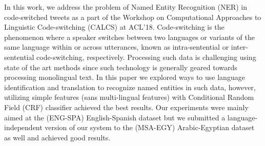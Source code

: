 In this work, we address the problem of Named Entity Recognition (NER) in code-switched tweets as a part of the Workshop on Computational Approaches to Linguistic Code-switching (CALCS) at ACL'18. Code-switching is the phenomenon where a speaker switches between two languages or variants of the same language within or across utterances, known as intra-sentential or inter-sentential code-switching, respectively. Processing such data is challenging using state of the art methods since such technology is generally geared towards processing monolingual text. In this paper we explored  ways to use language identification and translation to recognize named entities in such data, however, utilizing simple features (sans multi-lingual features) with Conditional Random Field (CRF) classifier achieved the best results. Our experiments were mainly aimed at the (ENG-SPA) English-Spanish dataset but we submitted a language-independent version of our system to the (MSA-EGY) Arabic-Egyptian dataset as well and achieved good results.
